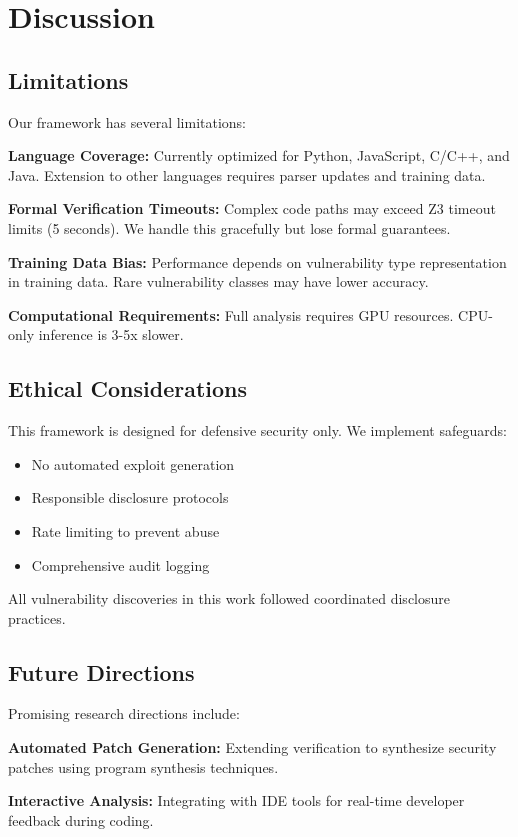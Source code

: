 \documentclass[10pt,journal,compsoc]{IEEEtran}
\begin{document}
\section{Discussion}

\subsection{Limitations}
Our framework has several limitations:

\textbf{Language Coverage:} Currently optimized for Python, JavaScript, C/C++, and Java. Extension to other languages requires parser updates and training data.

\textbf{Formal Verification Timeouts:} Complex code paths may exceed Z3 timeout limits (5 seconds). We handle this gracefully but lose formal guarantees.

\textbf{Training Data Bias:} Performance depends on vulnerability type representation in training data. Rare vulnerability classes may have lower accuracy.

\textbf{Computational Requirements:} Full analysis requires GPU resources. CPU-only inference is 3-5x slower.

\subsection{Ethical Considerations}
This framework is designed for defensive security only. We implement safeguards:
\begin{itemize}
\item No automated exploit generation
\item Responsible disclosure protocols
\item Rate limiting to prevent abuse
\item Comprehensive audit logging
\end{itemize}

All vulnerability discoveries in this work followed coordinated disclosure practices.

\subsection{Future Directions}
Promising research directions include:

\textbf{Automated Patch Generation:} Extending verification to synthesize security patches using program synthesis techniques.

\textbf{Interactive Analysis:} Integrating with IDE tools for real-time developer feedback during coding.
\end{document}
